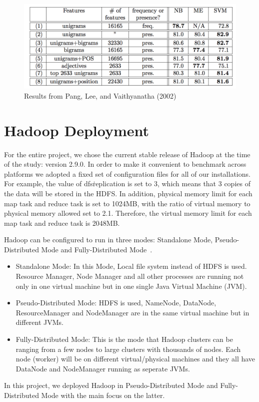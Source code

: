 \begin{figure}[!ht]
	\centering\includegraphics[width=\columnwidth]{images/pang-result.png}
        \caption{Results
	from Pang, Lee, and Vaithyanatha
	(2002)~\cite{hid-sp18-405-sentiment-pang2002thumbs}}\label{f:pang-result}
\end{figure}


\section{Hadoop Deployment}\label{s:hadoopdep}

For the entire project, we chose the current stable release of Hadoop
at the time of the study: version 2.9.0. In order to make it
convenient to benchmark across platforms we adopted a fixed set of
configuration files for all of our installations. For example, the
value of dfs\.replication is set to 3, which means that 3 copies of
the data will be stored in the HDFS. In addition, physical memory
limit for each map task and reduce task is set to 1024MB, with the
ratio of virtual memory to physical memory allowed set to
2.1. Therefore, the virtual memory limit for each map task and reduce
task is 2048MB.

Hadoop can be configured to run in three modes: Standalone Mode, 
Pseudo-Distributed Mode and Fully-Distributed 
Mode~\cite{hid-sp18-405-hadoop-singlenode}. 
\begin{itemize}
	\item Standalone Mode: In this Mode, Local file system instead of
        HDFS is used. Resource Manager, Node Manager and all other
        processes are running not only in one virtual machine but in one
        single Java Virtual Machine (JVM).
	\item Pseudo-Distributed Mode: HDFS is used, NameNode, DataNode, 
	ResourceManager and NodeManager are in the same virtual machine
        but in different JVMs. 
	\item Fully-Distributed Mode: This is the mode that Hadoop
        clusters can be ranging from a few nodes to large clusters with
        thousands of nodes. Each node (worker) will be on different
        virtual/physical machines and they all have DataNode and
        NodeManager running as seperate JVMs.
\end{itemize}
In this project, we deployed Hadoop in Pseudo-Distributed Mode and 
Fully-Distributed Mode with the main focus on the latter. 

